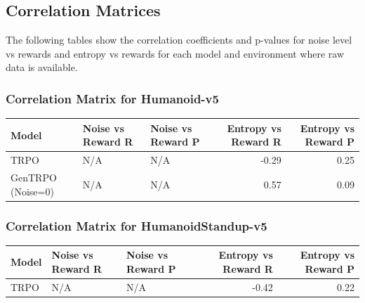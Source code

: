 \documentclass{svproc}
\begin{document}
\begin{table}[htbp]
\centering
\caption{Detailed Metrics for All Model-Environment Pairs}
\end{table}
\subsection{Correlation Matrices}
The following tables show the correlation coefficients and p-values for noise level vs rewards and entropy vs rewards for each model and environment where raw data is available.

\subsubsection{Correlation Matrix for Humanoid-v5}
\begin{tabular}{lllrr}
\toprule
Model & Noise vs Reward R & Noise vs Reward P & Entropy vs Reward R & Entropy vs Reward P \\
\midrule
TRPO & N/A & N/A & -0.29 & 0.25 \\
GenTRPO (Noise=0) & N/A & N/A & 0.57 & 0.09 \\
\bottomrule
\end{tabular}


\subsubsection{Correlation Matrix for HumanoidStandup-v5}
\begin{tabular}{lllrr}
\toprule
Model & Noise vs Reward R & Noise vs Reward P & Entropy vs Reward R & Entropy vs Reward P \\
\midrule
TRPO & N/A & N/A & -0.42 & 0.22 \\
\bottomrule
\end{tabular}
\end{document}
